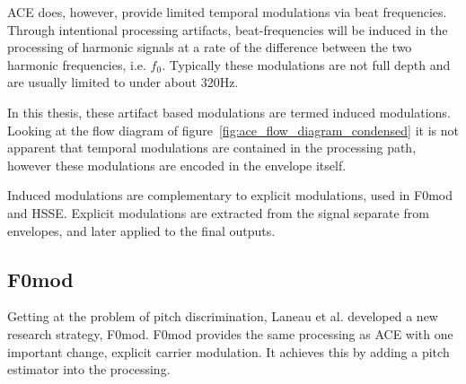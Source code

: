 \documentclass [11pt, proquest,oneside] {ganter_thesis}[2015/03/03]
\begin{document}



ACE does, however, provide limited temporal modulations via beat frequencies.  Through intentional processing artifacts, beat-frequencies will be induced in the processing of harmonic signals at a rate of the difference between the two harmonic frequencies, i.e. $f_0$.  Typically these modulations are not full depth and are usually limited to under about 320Hz.

In this thesis, these artifact based modulations are termed induced modulations.  Looking at the flow diagram of figure~\ref{fig:ace_flow_diagram_condensed} it is not apparent that temporal modulations are contained in the processing path, however these modulations are encoded in the envelope itself.

Induced modulations are complementary to explicit modulations, used in F0mod and HSSE.  Explicit modulations are extracted from the signal separate from envelopes, and later applied to the final outputs.

\subsection{F0mod}

Getting at the problem of pitch discrimination, Laneau et al. \cite{laneau2006improved} developed a new research strategy, F0mod.  F0mod provides the same processing as ACE with one important change, explicit carrier modulation.  It achieves this by adding a pitch estimator into the processing.
\end{document}
